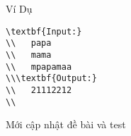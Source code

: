 Ví Dụ  
\begin{verbatim}
\textbf{Input:}
\\   papa
\\   mama
\\   mpapamaa
\\\textbf{Output:}
\\   21112212
\\\end{verbatim}
	\item    Mới cập nhật đề bài và test